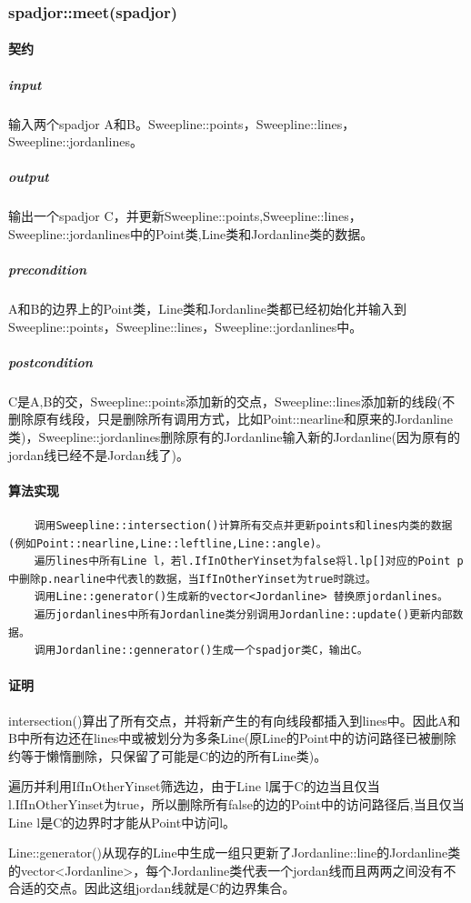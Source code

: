 \documentclass[a4paper]{book}
\numberwithin{equation}{chapter}
\theoremstyle{definition}
\begin{document}
\subsubsection{spadjor::meet(spadjor)}
\paragraph{契约}
\subparagraph{input}
输入两个spadjor A和B。Sweepline::points，Sweepline::lines，Sweepline::jordanlines。
\subparagraph{output}
输出一个spadjor C，并更新Sweepline::points,Sweepline::lines，Sweepline::jordanlines中的Point类,Line类和Jordanline类的数据。
\subparagraph{precondition}
A和B的边界上的Point类，Line类和Jordanline类都已经初始化并输入到Sweepline::points，Sweepline::lines，Sweepline::jordanlines中。
\subparagraph{postcondition}
C是A,B的交，Sweepline::points添加新的交点，Sweepline::lines添加新的线段(不删除原有线段，只是删除所有调用方式，比如Point::nearline和原来的Jordanline类)，Sweepline::jordanlines删除原有的Jordanline输入新的Jordanline(因为原有的jordan线已经不是Jordan线了)。
\paragraph{算法实现}
\begin{lstlisting}
	调用Sweepline::intersection()计算所有交点并更新points和lines内类的数据(例如Point::nearline,Line::leftline,Line::angle)。
	遍历lines中所有Line l，若l.IfInOtherYinset为false将l.lp[]对应的Point p 中删除p.nearline中代表l的数据，当IfInOtherYinset为true时跳过。
	调用Line::generator()生成新的vector<Jordanline> 替换原jordanlines。
	遍历jordanlines中所有Jordanline类分别调用Jordanline::update()更新内部数据。
	调用Jordanline::gennerator()生成一个spadjor类C，输出C。
\end{lstlisting}
\paragraph{证明}
	intersection()算出了所有交点，并将新产生的有向线段都插入到lines中。因此A和B中所有边还在lines中或被划分为多条Line(原Line的Point中的访问路径已被删除约等于懒惰删除，只保留了可能是C的边的所有Line类)。
	
	遍历并利用IfInOtherYinset筛选边，由于Line l属于C的边当且仅当l.IfInOtherYinset为true，所以删除所有false的边的Point中的访问路径后,当且仅当Line l是C的边界时才能从Point中访问l。
	
	Line::generator()从现存的Line中生成一组只更新了Jordanline::line的Jordanline类的vector<Jordanline>，每个Jordanline类代表一个jordan线而且两两之间没有不合适的交点。因此这组jordan线就是C的边界集合。
	
\end{document}
